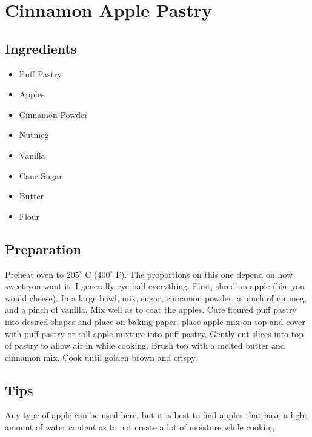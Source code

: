 \thispagestyle{fancy}
\section{Cinnamon Apple Pastry} \label{CinnamonApplePastry}
\AddToShipoutPicture*{\cinnamonapplepastry}

\subsection*{Ingredients}

\begin{multicols}{3}
	\begin{itemize}
		\item Puff Pastry
		\item Apples
		\item Cinnamon Powder
		\item Nutmeg
		\item Vanilla
		\item Cane Sugar
		\item Butter
		\item Flour
	\end{itemize}
\end{multicols}

\subsection*{Preparation}

Preheat oven to $205^\circ$ C ($400^\circ$ F). The proportions on this one depend on how sweet you want it. I generally eye-ball everything. First, shred an apple (like you would cheese). In a large bowl, mix, sugar, cinnamon powder, a pinch of nutmeg, and a pinch of vanilla. Mix well as to coat the apples. Cute floured puff pastry into desired shapes and place on baking paper, place apple mix on top and cover with puff pastry or roll apple mixture into puff pastry. Gently cut slices into top of pastry to allow air in while cooking. Brush top with a melted butter and cinnamon mix. Cook until golden brown and crispy.


\subsection*{Tips}

Any type of apple can be used here, but it is best to find apples that have a light amount of water content as to not create a lot of moisture while cooking.